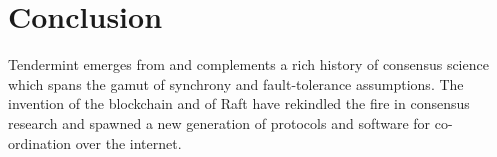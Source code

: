 \section{Conclusion}

Tendermint emerges from and complements a rich history of consensus science which spans the gamut of synchrony and fault-tolerance assumptions. 
The invention of the blockchain and of Raft have rekindled the fire in consensus research and spawned a new generation 
of protocols and software for co-ordination over the internet.
